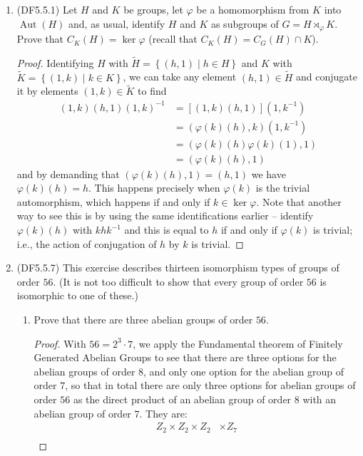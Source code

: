 \documentclass[11pt]{article}
\newcommand{\sbr}[1]{\left[#1\right]}
\newcommand{\cbr}[1]{\left\{#1\right\}}
\DeclareMathOperator\Aut{Aut}
\begin{document}
\begin{enumerate}
    \item (DF5.5.1) Let $H$ and $K$ be groups, let $\varphi$ be a homomorphism from $K$ into $\Aut(H)$ and, as usual, identify $H$ and $K$ as subgroups of $G = H\rtimes_{\varphi}K$.\\ Prove that $C_K(H) = \ker\varphi$ (recall that $C_K(H) = C_G(H)\cap K$).
    \begin{proof}
      Identifying $H$ with $\widetilde{H} = \cbr{(h,1)\mid h\in H}$ and $K$ with $\widetilde{K} = \cbr{(1,k)\mid k\in K}$, we can take any element $(h,1)\in \widetilde{H}$ and conjugate it by elements $(1,k)\in \widetilde{K}$ to find \begin{align*}
        (1,k)(h,1)(1,k)^{-1} &= \sbr{(1,k)(h,1)}(1,k^{-1})\\
        &= (\varphi(k)(h), k)(1,k^{-1})\\
        &= (\varphi(k)(h)\varphi(k)(1), 1)\\
        &= (\varphi(k)(h), 1)
      \end{align*} and by demanding that $(\varphi(k)(h), 1) = (h,1)$ we have $\varphi(k)(h) = h$. This happens precisely when $\varphi(k)$ is the trivial automorphism, which happens if and only if $k\in \ker{\varphi}$. Note that another way to see this is by using the same identifications earlier -- identify $\varphi(k)(h)$ with $khk^{-1}$ and this is equal to $h$ if and only if $\varphi(k)$ is trivial; i.e., the action of conjugation of $h$ by $k$ is trivial.
    \end{proof}
    \item (DF5.5.7) This exercise describes thirteen isomorphism types of groups of order $56$. (It is not too difficult to show that every group of order $56$ is isomorphic to one of these.)\begin{enumerate}[label=\textbf{(\alph*)}]
        \item Prove that there are three abelian groups of order $56$.
        \begin{proof}
          With $56 = 2^3\cdot 7$, we apply the Fundamental theorem of Finitely Generated Abelian Groups to see that there are three options for the abelian groups of order $8$, and only one option for the abelian group of order $7$, so that in total there are only three options for abelian groups of order $56$ as the direct product of an abelian group of order $8$ with an abelian group of order $7$. They are: \begin{align*}
            Z_2\times Z_2 \times Z_2 &\times Z_7\\

\end{align*}
\end{proof}
\end{enumerate}
\end{enumerate}
\end{document}
